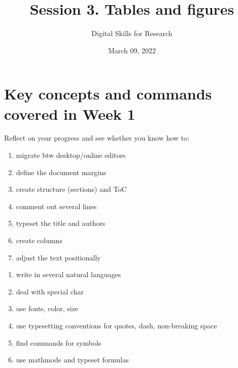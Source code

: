 \documentclass[a4paper,11pt]{article}
\title{Session 3. Tables and figures}
\author{Digital Skills for Research}
\date{March 09, 2022}
\begin{document}
\clearpage
\maketitle
\thispagestyle{empty}

\tableofcontents

\section*{Key concepts and commands covered in Week 1}

Reflect on your progress and see whether you know how to:

\bigskip

\begin{tcolorbox}[width=.475\textwidth, nobeforeafter,height=6.5cm,valign=center, fonttitle=\bfseries,title=Session 1]
		\begin{enumerate}
		\item migrate btw desktop/online editors
		\item define the document margins
		\item create structure (sections) and ToC
		\item comment out several lines
		\item typeset the title and authors
		\item create columns
		\item adjust the text positionally 
	\end{enumerate}
\end{tcolorbox}\hfill
%
\begin{tcolorbox}[width=.475\textwidth, nobeforeafter,height=6.5cm,valign=center,fonttitle=\bfseries,title=Session 2]
	\begin{enumerate}
		\item write in several natural languages
		\item deal with special char
		\item use fonts, color, size
		\item use typesetting conventions for quotes, dash, non-breaking space
		\item find commands for symbols
		\item use mathmode and typeset formulas
	\end{enumerate}
\end{tcolorbox}
\end{document}
